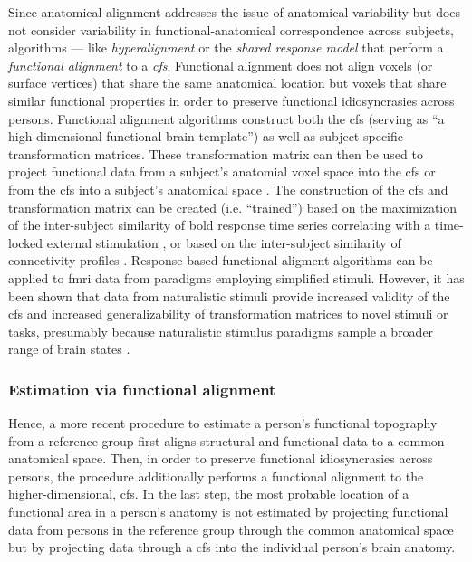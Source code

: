 Since anatomical alignment addresses the issue of anatomical variability but
does not consider variability in functional-anatomical correspondence across
subjects, algorithms --- like \textit{hyperalignment} \citep{haxby2011common,
guntupalli2016model} or the \textit{shared response model}
\citep{chen2015reduced, zhang2016searchlight} that perform a \textit{functional
alignment} to a \textit{\ac{cfs}}.
%
Functional alignment does not align voxels (or surface vertices) that share the
same anatomical location but voxels that share similar functional properties in
order to preserve functional idiosyncrasies across persons.
%
Functional alignment algorithms construct both the \ac{cfs} (serving as ``a
high-dimensional functional brain template'') as well as subject-specific
transformation matrices.
%
These transformation matrix can then be used to project functional data from a
subject's anatomial voxel space into the \ac{cfs} or from the \ac{cfs} into a
subject's anatomical space \citep{haxby2020hyperalignment}.
%
The construction of the \ac{cfs} and transformation matrix can be created (i.e.
``trained'') based on the maximization of the inter-subject similarity of
\ac{bold} response time series correlating with a time-locked external
stimulation \citep{haxby2011common, chen2015reduced, sabuncu2010function}, or
based on the inter-subject similarity of connectivity profiles
\citep{feilong2018reliable, guntupalli2018computational, nastase2019leveraging}.
%
Response-based functional aligment algorithms can be applied to \ac{fmri} data
from paradigms employing simplified stimuli.
%
However, it has been shown that data from naturalistic stimuli provide increased
validity of the \ac{cfs} and increased generalizability of transformation
matrices to novel stimuli or tasks, presumably because naturalistic stimulus
paradigms sample a broader range of brain states \citep{haxby2011common,
guntupalli2016model}.


\subsubsection{Estimation via functional alignment}


%
Hence, a more recent procedure to estimate a person's functional topography from
a reference group first aligns structural and functional data to a common
anatomical space. Then, in order to preserve functional idiosyncrasies across
persons, the procedure additionally performs a functional alignment to
the higher-dimensional, \ac{cfs}.
In the last step, the most probable location of a functional area in a person's
anatomy is not estimated by projecting functional data from persons in the
reference group through the common anatomical space but by projecting data
through a \ac{cfs} into the individual person's brain anatomy.


